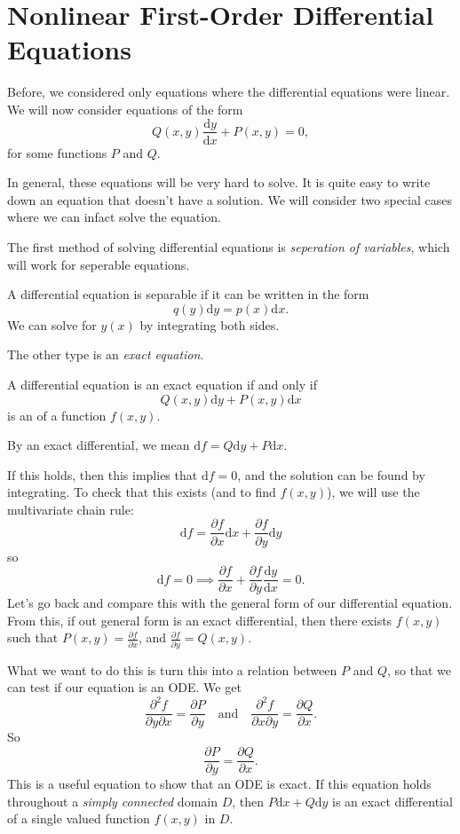 \documentclass[a4paper]{scrreprt}
\newcommand{\dd}{\mathrm{d}}
\begin{document}
\chapter{Nonlinear First-Order Differential Equations}

Before, we considered only equations where the differential equations were linear. We will now consider equations of the form
$$
Q(x, y) \frac{\dd y}{\dd x} + P(x, y) = 0,
$$
for some functions $P$ and $Q$.

In general, these equations will be very hard to solve. It is quite easy to write down an equation that doesn't have a solution. We will consider two special cases where we can infact solve the equation.

The first method of solving differential equations is \emph{seperation of variables}, which will work for seperable equations.

\begin{definition}
A differential equation is separable if it can be written in the form
$$
q(y) \dd y = p(x) \dd x.
$$
We can solve for $y(x)$ by integrating both sides.
\end{definition}

The other type is an \emph{exact equation}.

\begin{definition}
	A differential equation is an exact equation if and only if 
	$$
	Q(x, y) \dd y + P(x, y) \dd x 
	$$
	is an  of a function $f(x, y)$.
\end{definition}

By an exact differential, we mean $\dd f = Q \dd y + P \dd x$.

If this holds, then this implies that $\dd f = 0$, and the solution can be found by integrating.
To check that this exists (and to find $f(x, y)$), we will use the multivariate chain rule:
$$
\dd f=\frac{\partial f}{\partial x} \dd x+\frac{\partial f}{\partial y} \dd y
$$
so
$$
\dd f = 0 \implies \frac{\partial f}{\partial x} + \frac{\partial f}{\partial y} \frac{\dd y}{\dd x} = 0.
$$
Let's go back and compare this with the general form of our differential equation. From this, if out general form is an exact differential, then there exists $f(x, y)$ such that $P(x, y) = \frac{\partial f}{\partial x}$, and $\frac{\partial f}{\partial y} = Q(x, y)$.

What we want to do this is turn this into a relation between $P$ and $Q$, so that we can test if our equation is an ODE. We get
$$
\frac{\partial^2 f}{\partial y \partial x} = \frac{\partial P}{\partial y} \quad \text{and} \quad \frac{\partial^2 f}{\partial x \partial y} = \frac{\partial Q}{\partial x}.
$$
So
$$
\frac{\partial P}{\partial y} = \frac{\partial Q}{\partial x}.
$$
This is a useful equation to show that an ODE is exact. If this equation holds throughout a \emph{simply connected} domain $D$, then $P \dd x + Q \dd y$ is an exact differential of a single valued function $f(x, y)$ in $D$.
\end{document}
